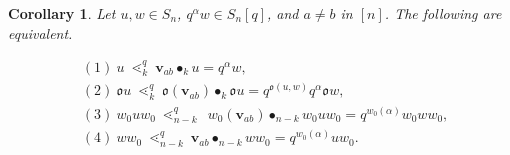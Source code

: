 \documentclass[11pt]{article}
\newtheorem{corollary}[theo]{Corollary}
\theoremstyle{definition}
\numberwithin{equation}{section}
\newcommand{\qv}{{\mathbf v}}
\DeclareMathOperator{\kactionop}{{\scriptstyle \bullet}}
\newcommand{\kaction}[1][k]{\kactionop_{#1}}
\newcommand{\ncycle}{\mathfrak o}
\begin{document}
\begin{corollary}\label{C:symmetries-q-ops}
  Let $u,w\in S_n$,  $q^\alpha w\in S_n[q]$, and $a\neq b$ in $[n]$.
  The following are equivalent.
  
  \begin{align*}
    & (1)\ u\ \lessdot_k^q\ \qv_{ab}\kaction u = q^\alpha w,\\
    & (2)\ \ncycle u\ \lessdot_k^q\ \ncycle(\qv_{ab})\kaction \ncycle u = q^{\ncycle(u,w)} q^\alpha \ncycle w,\\
    & (3)\ w_0uw_0\ \lessdot_{n-k}^q\ \ w_0(\qv_{ab})\kactionop_{n-k} w_0uw_0 =  q^{w_0(\alpha)} w_0 w w_0,\\
    & (4)\ w w_0\ \lessdot_{n-k}^q\ \qv_{ab}\kactionop_{n-k} ww_0 = q^{w_0(\alpha)} u w_0.
 \end{align*}
 
\end{corollary}
\end{document}
